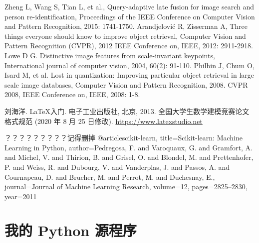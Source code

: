 \documentclass[bwprint]{gmcmthesis}
\begin{document}
\begin{thebibliography}{99}  
Zheng L, Wang S, Tian L, et al., Query-adaptive late fusion for image search and person re-identification, Proceedings of the IEEE Conference on Computer Vision and Pattern Recognition, 2015: 1741-1750.  
Arandjelović R, Zisserman A, Three things everyone should know to improve object retrieval, Computer Vision and Pattern Recognition (CVPR), 2012 IEEE Conference on, IEEE, 2012: 2911-2918.  
Lowe D G. Distinctive image features from scale-invariant keypoints, International journal of computer vision, 2004, 60(2): 91-110.  
Philbin J, Chum O, Isard M, et al. Lost in quantization: Improving particular object retrieval in large scale image databases, Computer Vision and Pattern Recognition, 2008. CVPR 2008, IEEE Conference on, IEEE, 2008: 1-8.  
\end{thebibliography}



% 
% 


\begin{thebibliography}{9}%
    刘海洋.
    \newblock \LaTeX {}入门\allowbreak[J].
    \newblock 电子工业出版社, 北京, 2013.
    全国大学生数学建模竞赛论文格式规范 (2020 年 8 月 25 日修改).
     \url{https://www.latexstudio.net}
\end{thebibliography}



？？？？？？？？？记得删掉
@article{scikit-learn,
 title={Scikit-learn: Machine Learning in {P}ython},
 author={Pedregosa, F. and Varoquaux, G. and Gramfort, A. and Michel, V.
         and Thirion, B. and Grisel, O. and Blondel, M. and Prettenhofer, P.
         and Weiss, R. and Dubourg, V. and Vanderplas, J. and Passos, A. and
         Cournapeau, D. and Brucher, M. and Perrot, M. and Duchesnay, E.},
 journal={Journal of Machine Learning Research},
 volume={12},
 pages={2825--2830},
 year={2011}
}




\newpage
\appendix
\section{我的 Python 源程序}
\begin{lstlisting}[language=Python]%设置不同语言即可。



 \end{lstlisting}
\end{document}
